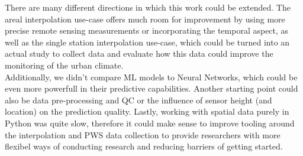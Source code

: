 There are many different directions in which this work could be extended. The areal interpolation use-case offers much room for improvement by using more precise remote sensing measurements or incorporating the temporal aspect, as well as the single station interpolation use-case, which could be turned into an actual study to collect data and evaluate how this data could improve the monitoring of the urban climate.\\
Additionally, we didn't compare ML models to Neural Networks, which could be even more powerfull in their predictive capabilities. Another starting point could also be data pre-processing and QC or the influence of sensor height (and location) on the prediction quality. Lastly, working with spatial data purely in Python was quite slow, therefore it could make sense to improve tooling around the interpolation and PWS data collection to provide researchers with more flexibel ways of conducting research and reducing barriers of getting started.
